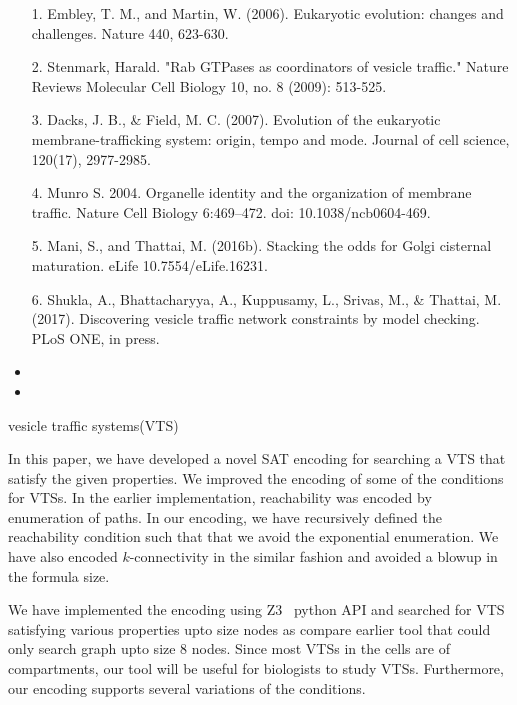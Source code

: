 \begin{itemize}
1. Embley, T. M., and Martin, W. (2006). Eukaryotic evolution: changes and challenges. Nature 440, 623-630.

2. Stenmark, Harald. "Rab GTPases as coordinators of vesicle traffic." Nature Reviews Molecular Cell Biology 10, no. 8 (2009): 513-525.

3. Dacks, J. B., & Field, M. C. (2007). Evolution of the eukaryotic membrane-trafficking system: origin, tempo and mode. Journal of cell science, 120(17), 2977-2985.

4. Munro S. 2004. Organelle identity and the organization of membrane traffic. Nature Cell Biology 6:469–472. doi: 10.1038/ncb0604-469.

5. Mani, S., and Thattai, M. (2016b). Stacking the odds for Golgi cisternal maturation. eLife 10.7554/eLife.16231.

6. Shukla, A., Bhattacharyya, A., Kuppusamy, L., Srivas, M., & Thattai, M. (2017). Discovering vesicle traffic network constraints by model checking. PLoS ONE, in press.

\item {}

\item {}

\end{itemize}




vesicle traffic systems(VTS)





%

In this paper, we have developed a novel SAT encoding for
searching a VTS that satisfy the given properties.
%
We improved the encoding of some of the conditions for VTSs.
%
In the earlier implementation, reachability was encoded by
enumeration of paths.
%
In our encoding, we have recursively defined the reachability condition
such that that we avoid the exponential enumeration.
%
We have also encoded $k$-connectivity in the similar fashion and
avoided a blowup in the formula size.
%

We have implemented the encoding using Z3~\cite{z3} python API and searched for
VTS satisfying various properties upto size  nodes as compare
earlier tool that could only search graph upto size 8 nodes.
%
Since most VTSs in the cells are of  compartments,
our tool will be useful for biologists to study VTSs.
%
Furthermore, our encoding supports several variations of
the conditions.

